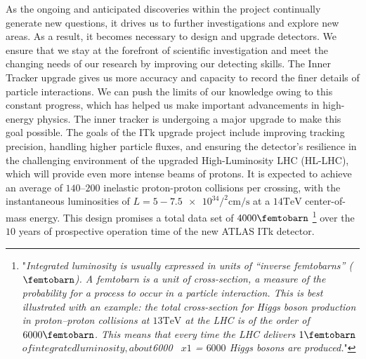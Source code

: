 As the ongoing and anticipated discoveries within the project continually generate new questions, it drives us to further investigations and explore new areas. As a result, it becomes necessary to design and upgrade detectors. We ensure that we stay at the forefront of scientific investigation and meet the changing needs of our research by improving our detecting skills. The Inner Tracker upgrade gives us more accuracy and capacity to record the finer details of particle interactions. We can push the limits of our knowledge owing to this constant progress, which has helped us make important advancements in high-energy physics. The inner tracker is undergoing a major upgrade to make this goal possible. The goals of the ITk upgrade project include improving tracking precision, handling higher particle fluxes, and ensuring the detector's resilience in the challenging environment of the upgraded High-Luminosity LHC (HL-LHC), which will provide even more intense beams of protons. It is expected to achieve an average of $140$–$200$ inelastic proton-proton collisions per crossing, with the instantaneous luminosities of $L = 5-\num{7.5e34} \si{\square\per\centi\meter\per\second} $ at a $14  \si{\tera\eV}$ center-of-mass energy. This design promises a total data set of $4000 \si{\per\femtobarn}$ \footnote{"\textit{Integrated luminosity is usually expressed in units of “inverse femtobarns” ($\si{\per\femtobarn}$). A femtobarn is a unit of cross-section, a measure of the probability for a process to occur in a particle interaction. This is best illustrated with an example: the total cross-section for Higgs boson production in proton–proton collisions at $13 \si{\tera\eV}$ at the LHC is of the order of $6000\si{\per\femtobarn}$. This means that every time the LHC delivers $1\si{\per\femtobarn}$$ of integrated luminosity, about $6000 \si{\per\femtobarn}$ x 1 $\si{\femtobarn} = $6000$ Higgs bosons are produced.}"\cite{CERNweb}} over the $10$ years of prospective operation time of the new ATLAS ITk detector. \\

